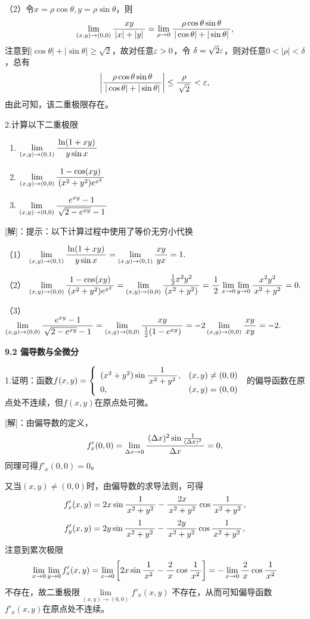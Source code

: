 （2）令$x=\rho\cos\theta,y=\rho\sin\theta$，则
$$\lim\limits_{(x,y)\to(0,0)}\displaystyle\frac{\,{xy}\,}{\,{|x|+|y|}\,}
=\lim\limits_{\rho\to0}\displaystyle\frac{\,{\rho\cos\theta\sin\theta}\,}{\,{|\cos\theta|+|\sin\theta|}\,},$$
注意到$|\cos\theta|+|\sin\theta|\geq\sqrt2$，故对任意$\varepsilon>0$，令
$\delta=\sqrt2\varepsilon$，则对任意$0<|\rho|<\delta$，总有
$$\left|\displaystyle\frac{\,{\rho\cos\theta\sin\theta}\,}{\,{|\cos\theta|+|\sin\theta|}\,}\right|
\leq\displaystyle\frac{\,{\rho}\,}{\,{\sqrt2}\,}<\varepsilon,$$
由此可知，该二重极限存在。\fin

2.计算以下二重极限
\begin{enumerate}[(1)]
    \setlength{\itemindent}{1cm}
    \item $\lim\limits_{(x,y)\to(0,1)}\displaystyle\frac{\,{\ln(1+xy)}\,}{\,{y\sin x}\,}$
    \item $\lim\limits_{(x,y)\to(0,0)}\displaystyle\frac{\,{1-\cos(xy)}\,}{\,{(x^2+y^2)e^{x^2}}\,}$
    \item $\lim\limits_{(x,y)\to(0,0)}\displaystyle\frac{\,{e^{xy}-1}\,}{\,{\sqrt{2-e^{xy}}-1}\,}$
  \end{enumerate}

[解]：提示：以下计算过程中使用了等价无穷小代换

（1）
$\lim\limits_{(x,y)\to(0,1)}\displaystyle\frac{\,{\ln(1+xy)}\,}{\,{y\sin x}\,}
=\lim\limits_{(x,y)\to(0,1)}\displaystyle\frac{\,{xy}\,}{\,{yx}\,}=1.$

（2）
$\lim\limits_{(x,y)\to(0,0)}\displaystyle\frac{\,{1-\cos(xy)}\,}{\,{(x^2+y^2)e^{x^2}}\,}
=\lim\limits_{(x,y)\to(0,0)}\displaystyle\frac{\,{\frac12x^2y^2}\,}{\,{(x^2+y^2)}\,}
=\displaystyle\frac{\,{1}\,}{\,{2}\,}\lim\limits_{x\to 0}\lim\limits_{y\to0}\displaystyle\frac{\,{x^2y^2}\,}{\,{x^2+y^2}\,}=0.$

（3）
$\lim\limits_{(x,y)\to(0,0)}\displaystyle\frac{\,{e^{xy}-1}\,}{\,{\sqrt{2-e^{xy}}-1}\,}
=\lim\limits_{(x,y)\to(0,0)}\displaystyle\frac{\,{xy}\,}{\,{\frac12(1-e^{xy})}\,}
=-2\lim\limits_{(x,y)\to(0,0)}\displaystyle\frac{\,{xy}\,}{\,{xy}\,}=-2.$
\fin

\bs

\begin{center}
	\bf 9.2 偏导数与全微分
\end{center}

1.证明：函数$f(x,y)=\left\{\begin{array}{ll}
  	(x^2+y^2)\sin\displaystyle\frac{\,{1}\,}{\,{x^2+y^2}\,}, & (x,y)\ne(0,0)\\
  	0, & (x,y)=(0,0)
  \end{array}\right.$
  的偏导函数在原点处不连续，但$f(x,y)$在原点处可微。

[解]：由偏导数的定义，
$$f'_x(0,0)=\lim\limits_{\Delta x\to 0}
\displaystyle\frac{\,{(\Delta x)^2\sin\frac1{(\Delta x)^2}}\,}{\,{\Delta x}\,}=0,$$
同理可得$f'_x(0,0)=0$。

又当$(x,y)\ne(0,0)$时，由偏导数的求导法则，可得
$$f'_x(x,y)=2x\sin\displaystyle\frac{\,{1}\,}{\,{x^2+y^2}\,}-\displaystyle\frac{\,{2x}\,}{\,{x^2+y^2}\,}\cos\displaystyle\frac{\,{1}\,}{\,{x^2+y^2}\,},$$
$$f'_y(x,y)=2y\sin\displaystyle\frac{\,{1}\,}{\,{x^2+y^2}\,}-\displaystyle\frac{\,{2y}\,}{\,{x^2+y^2}\,}\cos\displaystyle\frac{\,{1}\,}{\,{x^2+y^2}\,},$$
注意到累次极限
$$\lim\limits_{x\to 0}\lim\limits_{y\to 0}
f'_x(x,y)
=\lim\limits_{x\to 0}
\left[2x\sin\displaystyle\frac{\,{1}\,}{\,{x^2}\,}-\displaystyle\frac{\,{2}\,}{\,{x}\,}\cos\displaystyle\frac{\,{1}\,}{\,{x^2}\,}\right]
=-\lim\limits_{x\to 0}
\displaystyle\frac{\,{2}\,}{\,{x}\,}\cos\displaystyle\frac{\,{1}\,}{\,{x^2}\,}$$
不存在，故二重极限$\lim\limits_{(x,y)\to(0,0)}f'_x(x,y)$
不存在，从而可知偏导函数$f'_x(x,y)$在原点处不连续。

